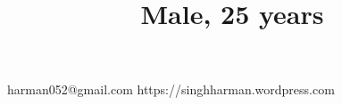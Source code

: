 \title{\normalsize Male, 25 years}

\address
    {H.No. 195, Street No. 3, Bachittar Nagar, Gill Road Ludhiana - 141006, Punjab, India}

\address
    {\#195, Street\# 3, Bachittar Nagar, Gill Road Ludhiana - 141006, Punjab, India}
\email
    {harman052@gmail.com}
\homepage
    {https://singhharman.wordpress.com}
